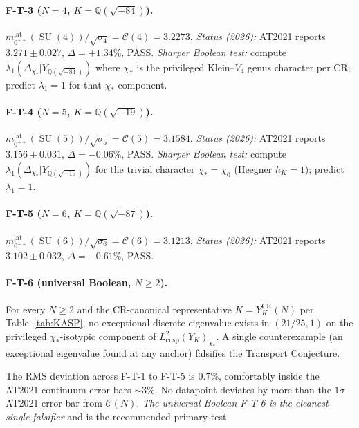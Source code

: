 \documentclass[11pt,a4paper,reqno]{amsart}
\theoremstyle{definition}
\DeclareMathOperator{\SU}{SU}
\newcommand{\YK}{Y_K}
\newcommand{\YKCR}{Y_K^{\mathrm{CR}}}
\newcommand{\QQ}{\mathbb{Q}}
\begin{document}
\paragraph{F-T-3 ($N=4$, $K=\QQ(\sqrt{-84})$).}
$m_{0^{++}}^{\mathrm{lat}}(\SU(4))/\sqrt{\sigma_4} = \mathcal{C}(4) = 3.2273$. \emph{Status (2026):} AT2021 reports $3.271 \pm 0.027$, $\Delta = +1.34\%$, PASS.
\emph{Sharper Boolean test:} compute $\lambda_1(\Delta_{\chi_*}|Y_{\QQ(\sqrt{-84})})$ where $\chi_*$ is the privileged Klein--$V_4$ genus character per CR; predict $\lambda_1 = 1$ for that $\chi_*$ component.

\paragraph{F-T-4 ($N=5$, $K=\QQ(\sqrt{-19})$).}
$m_{0^{++}}^{\mathrm{lat}}(\SU(5))/\sqrt{\sigma_5} = \mathcal{C}(5) = 3.1584$. \emph{Status (2026):} AT2021 reports $3.156 \pm 0.031$, $\Delta = -0.06\%$, PASS.
\emph{Sharper Boolean test:} compute $\lambda_1(\Delta_{\chi_*}|Y_{\QQ(\sqrt{-19})})$ for the trivial character $\chi_* = \chi_0$ (Heegner $h_K = 1$); predict $\lambda_1 = 1$.

\paragraph{F-T-5 ($N=6$, $K=\QQ(\sqrt{-87})$).}
$m_{0^{++}}^{\mathrm{lat}}(\SU(6))/\sqrt{\sigma_6} = \mathcal{C}(6) = 3.1213$. \emph{Status (2026):} AT2021 reports $3.102 \pm 0.032$, $\Delta = -0.61\%$, PASS.

\paragraph{F-T-6 (universal Boolean, $N\ge 2$).} For every $N\ge 2$ and the CR-canonical representative $K = \YKCR(N)$ per Table~\ref{tab:KASP}, no exceptional discrete eigenvalue exists in $(21/25, 1)$ on the privileged $\chi_*$-isotypic component of $L^2_{\mathrm{cusp}}(\YK)_{\chi_*}$. A single counterexample (an exceptional eigenvalue found at any anchor) falsifies the Transport Conjecture.

\smallskip

\noindent
The RMS deviation across F-T-1 to F-T-5 is $0.7\%$, comfortably inside the AT2021 continuum error bars $\sim 3\%$. No datapoint deviates by more than the $1\sigma$ AT2021 error bar from $\mathcal{C}(N)$. \emph{The universal Boolean F-T-6 is the cleanest single falsifier} and is the recommended primary test.
\end{document}
